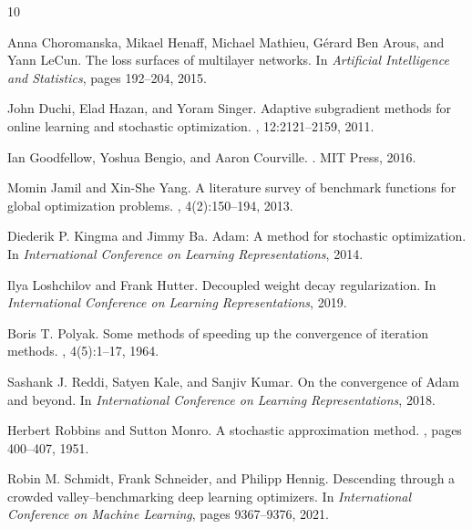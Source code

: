 \documentclass[12pt,a4paper]{article}
\begin{document}

\begin{thebibliography}{10}

Anna Choromanska, Mikael Henaff, Michael Mathieu, Gérard Ben Arous, and Yann LeCun.
\newblock The loss surfaces of multilayer networks.
\newblock In {\em Artificial Intelligence and Statistics}, pages 192--204, 2015.

John Duchi, Elad Hazan, and Yoram Singer.
\newblock Adaptive subgradient methods for online learning and stochastic optimization.
, 12:2121--2159, 2011.

Ian Goodfellow, Yoshua Bengio, and Aaron Courville.
.
\newblock MIT Press, 2016.

Momin Jamil and Xin-She Yang.
\newblock A literature survey of benchmark functions for global optimization problems.
, 4(2):150--194, 2013.

Diederik P. Kingma and Jimmy Ba.
\newblock Adam: A method for stochastic optimization.
\newblock In {\em International Conference on Learning Representations}, 2014.

Ilya Loshchilov and Frank Hutter.
\newblock Decoupled weight decay regularization.
\newblock In {\em International Conference on Learning Representations}, 2019.

Boris T. Polyak.
\newblock Some methods of speeding up the convergence of iteration methods.
, 4(5):1--17, 1964.

Sashank J. Reddi, Satyen Kale, and Sanjiv Kumar.
\newblock On the convergence of Adam and beyond.
\newblock In {\em International Conference on Learning Representations}, 2018.

Herbert Robbins and Sutton Monro.
\newblock A stochastic approximation method.
, pages 400--407, 1951.

Robin M. Schmidt, Frank Schneider, and Philipp Hennig.
\newblock Descending through a crowded valley--benchmarking deep learning optimizers.
\newblock In {\em International Conference on Machine Learning}, pages 9367--9376, 2021.


\end{thebibliography}
\end{document}

